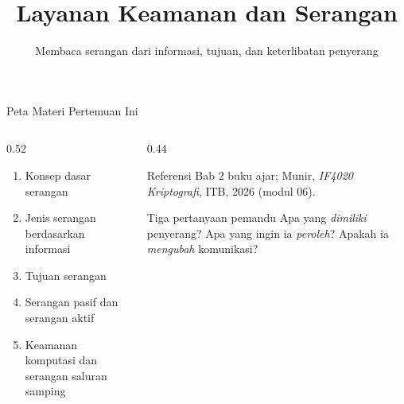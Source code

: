 \documentclass[aspectratio=169,11pt]{beamer}
\title{Layanan Keamanan dan Serangan}
\subtitle{Membaca serangan dari informasi, tujuan, dan keterlibatan penyerang}
\begin{document}
\begin{frame}[plain]
    \titlepage
\end{frame}

\begin{frame}{Peta Materi Pertemuan Ini}
    \begin{columns}[T,onlytextwidth]
        \begin{column}{0.52\textwidth}
            \begin{enumerate}
                \item Konsep dasar serangan
                \item Jenis serangan berdasarkan informasi
                \item Tujuan serangan
                \item Serangan pasif dan serangan aktif
                \item Keamanan komputasi dan serangan saluran samping
            \end{enumerate}
        \end{column}
        \begin{column}{0.44\textwidth}
            \begin{block}{Referensi}
                \footnotesize
                Bab 2 buku ajar; Munir, \textit{IF4020 Kriptografi},
                ITB, 2026 (modul 06).
            \end{block}
            \begin{exampleblock}{Tiga pertanyaan pemandu}
                \footnotesize
                Apa yang \emph{dimiliki} penyerang? Apa yang ingin ia
                \emph{peroleh}? Apakah ia \emph{mengubah} komunikasi?
            \end{exampleblock}
        \end{column}
    \end{columns}
\end{frame}
\end{document}
